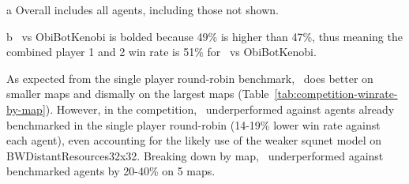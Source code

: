 \documentclass[conference]{IEEEtran}
\newcommand{\mapname}[1]{#1} %
\begin{document}
\begin{table}[t]
\begin{threeparttable}
\begin{tabular}{lcccccc|c}
    \end{tabular}
    \begin{tablenotes}
    \item[a] Overall includes all agents, including those not shown.
    \item[b] \agentName\ vs ObiBotKenobi is bolded because 49\% is higher than 47\%, thus meaning the combined player 1
    and 2 win rate is 51\% for \agentName\ vs ObiBotKenobi.
    \end{tablenotes}
    \end{threeparttable}
\end{table}

As expected from the single player round-robin benchmark, \agentName\ does better on
smaller maps and dismally on the largest maps
(Table~\ref{tab:competition-winrate-by-map}). However, in the competition, \agentName\
underperformed against agents already benchmarked in the single player round-robin
(14-19\% lower win rate against each agent), even accounting for the likely use of
the weaker squnet model on \mapname{BWDistantResources32x32}.  Breaking down by map, 
\agentName\ underperformed against benchmarked agents by 20-40\% on 5 maps.
\end{document}
